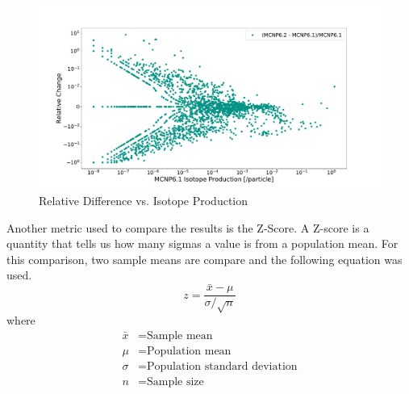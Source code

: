 \begin{figure}[h!]
        \centering
        \includegraphics[scale=0.4]{figs/reldiff_merbox_62_61.pdf}
	\caption{Relative Difference vs. Isotope Production}
        \label{fig:reldiff}
\end{figure}

Another metric used to compare the results is the Z-Score. A Z-score
is a quantity that tells us how many sigmas a value is from a population
mean. For this comparison, two sample means are compare and the following
equation was used. 
\begin{equation}
        z = \frac{\bar{x} - \mu }{\sigma / \sqrt{n}}
\end{equation}
where
\begin{equation}
\begin{split}
        \bar{x} &= \text{Sample mean} \\
        \mu     &= \text{Population mean} \\
        \sigma  &= \text{Population standard deviation} \\
        n       &= \text{Sample size}
\end{split}
\end{equation}

